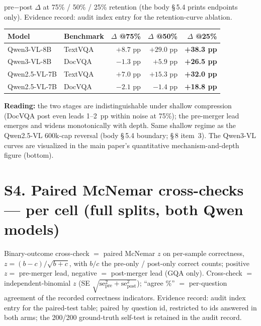 \documentclass[journal]{IEEEtran}
\begin{document}
pre$-$post $\Delta$ at 75\% / 50\% / 25\% retention (the body \S\,5.4 prints
endpoints only). Evidence record: audit index entry for the
retention-curve ablation.

\begin{table}[ht]
  \centering
  \footnotesize
  \begin{tabular}{@{}l l r r r@{}}
    \toprule
    Model & Benchmark & $\Delta$ @75\% & $\Delta$ @50\% & $\Delta$ @25\% \\
    \midrule
    Qwen3-VL-8B   & TextVQA & $+8.7$ pp  & $+29.0$ pp & \textbf{+38.3 pp} \\
    Qwen3-VL-8B   & DocVQA  & $-1.3$ pp  & $+5.9$ pp  & \textbf{+26.5 pp} \\
    Qwen2.5-VL-7B & TextVQA & $+7.0$ pp  & $+15.3$ pp & \textbf{+32.0 pp} \\
    Qwen2.5-VL-7B & DocVQA  & $-2.1$ pp  & $-1.4$ pp  & \textbf{+18.8 pp} \\
    \bottomrule
  \end{tabular}
\end{table}

\noindent\textbf{Reading:} the two stages are indistinguishable under shallow
compression (DocVQA post even leads 1--2~pp within noise at 75\%); the
pre-merger lead emerges and widens monotonically with depth. Same shallow
regime as the Qwen2.5-VL 600k-cap reversal (body \S\,5.4
boundary; \S\,8 item~3). The Qwen3-VL curves are visualized in the main
paper's quantitative mechanism-and-depth figure (bottom).

\section*{S4. Paired McNemar cross-checks --- per cell (full splits, both Qwen models)}

Binary-outcome cross-check $=$ paired McNemar $z$ on per-sample correctness,
$z = (b - c)/\sqrt{b + c}$, with $b/c$ the pre-only / post-only correct counts;
positive $z =$ pre-merger lead, negative $=$ post-merger lead (GQA only).
Cross-check $=$ independent-binomial $z$ (SE $\sqrt{\mathrm{se}^2_{\mathrm{pre}}
+ \mathrm{se}^2_{\mathrm{post}}}$); ``agree \%'' $=$ per-question agreement of
the recorded correctness indicators. Evidence record: audit index
entry for the paired-test table; paired by question id, restricted to ids answered
in both arms; the 200/200 ground-truth self-test is retained in the audit record.
\end{document}
